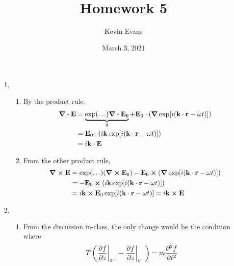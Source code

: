 \documentclass{homework}
\title{Homework 5}
\author{Kevin Evans}
\date{March 3, 2021}
\begin{document}
	\maketitle
	\begin{enumerate}
		\item \begin{enumerate}
			\item  By the product rule, \begin{align*}
				\div{ \boldsymbol{\mathrm{E}} } & = \underbrace{ \exp(\dots) \div{ \boldsymbol{\mathrm{E}} _0} }_{0} + \boldsymbol{\mathrm{E}}_0 \cdot \left(\grad{\exp[i( \boldsymbol{\mathrm{k}}  \cdot  \boldsymbol{\mathrm{r}}  - \omega t)]}\right) \\
				& = \boldsymbol{\mathrm{E}}_0 \cdot \left(i\boldsymbol{\mathrm{k}} \exp[i(\boldsymbol{\mathrm{k}} \cdot \boldsymbol{\mathrm{r}} - \omega t)]\right) \\
				& = i\boldsymbol{\mathrm{k}} \cdot \boldsymbol{\mathrm{E}}
			\end{align*}
		
			\item From the other product rule, \begin{align*}
				\curl{ \boldsymbol{\mathrm{E}} } & = \exp(\dots)(\curl{ \boldsymbol{\mathrm{E}} _0}) - \boldsymbol{\mathrm{E}}_0 \cross \left(\grad{\exp[i( \boldsymbol{\mathrm{k}}  \cdot  \boldsymbol{\mathrm{r}}  - \omega t)]}\right) \\
					& = -\boldsymbol{\mathrm{E}}_0 \cross \left(i \boldsymbol{\mathrm{k}} \exp[i(\boldsymbol{\mathrm{k}} \cdot \boldsymbol{\mathrm{r}} - \omega t)] \right) \\
					& = i\boldsymbol{\mathrm{k}} \cross \boldsymbol{\mathrm{E}}_0 \exp[i(\boldsymbol{\mathrm{k}} \cdot \boldsymbol{\mathrm{r}} - \omega t)] = i\boldsymbol{\mathrm{k}} \cross \boldsymbol{\mathrm{E}}
			\end{align*}
		\end{enumerate}
		
		\item \begin{enumerate}
			\item From the discussion in-class, the only change would be the condition where \begin{align*}
				T \left(\eval{ \pdv{f}{z} }_{0^+} - \eval{ \pdv{f}{z} }_{0^-} \right) & = m \pdv[2]{f}{t}
			\end{align*}
		

\end{enumerate}
\end{enumerate}
\end{document}
